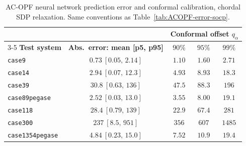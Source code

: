 \documentclass[10pt]{article} %
\theoremstyle{plain}
\theoremstyle{definition}
\theoremstyle{remark}
\begin{document}
\begin{table}[H]
\centering
\footnotesize
\caption{AC-OPF neural network prediction error and conformal calibration, chordal SDP relaxation. Same conventions as Table~\ref{tab:ACOPF-error-socp}.}
\begin{tabular}{lc ccc}
\toprule
& & \multicolumn{3}{c}{\textbf{Conformal offset } $q_\alpha$} \\
\cmidrule(lr){3-5}
\textbf{Test system} & \textbf{Abs.\ error: mean [p5, p95]} & $90\%$ & $95\%$ & $99\%$ \\
\midrule
\texttt{case9}          & $0.73\ [0.05,\,2.14]$    & $1.10$  & $1.60$  & $2.71$  \\
\texttt{case14}         & $2.94\ [0.07,\,12.3]$    & $4.93$  & $8.93$  & $18.3$  \\
\texttt{case39}         & $30.8\ [0.63,\,136]$     & $47.5$  & $88.3$  & $196$   \\
\texttt{case89pegase}   & $2.52\ [0.03,\,13.0]$    & $3.55$  & $8.00$  & $19.1$  \\
\texttt{case118}        & $28.4\ [0.79,\,139]$     & $22.9$  & $67.4$  & $281$   \\
\texttt{case300}        & $237\ [8.5,\,951]$       & $356$   & $607$   & $1485$  \\
\texttt{case1354pegase} & $4.84\ [0.23,\,15.0]$    & $7.52$  & $10.9$  & $19.4$  \\
\bottomrule
\end{tabular}
\label{tab:ACOPF-error-chordal}
\end{table}
\end{document}
